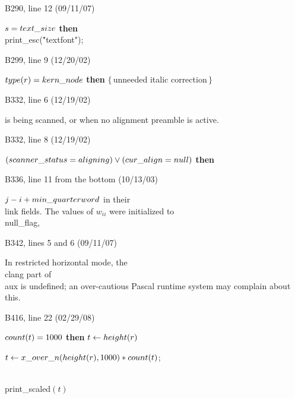 {{\bugonpage B290, line 12 (09/11/07)

\ninepoint\noindent
{} $s=\\{text\_size}$ {\bf then}
 \\{print\_esc}(\.{"textfont"});

\bugonpage B299, line 9 (12/20/02)

\ninepoint\noindent
\qquad\qquad{} $\\{type}(r)=\\{kern\_node}$ {\bf then}
 \quad$\{\,$unneeded italic correction$\,\}$

\bugonpage B332, line 6 (12/19/02)

\tenpoint\noindent
is being scanned, or when no alignment preamble is active.

\bugonpage B332, line 8 (12/19/02)

\ninepoint\noindent
{} $(\\{scanner\_status}=\\{aligning}) \lor
 (\\{cur\_align}=\\{null})$ {\bf then}

\bugonpage B336, line 11 from the bottom (10/13/03)

\tenpoint\noindent
$j-i+\\{min\_quarterword}$ in their
\\{link} fields. The values of $w_{ii}$ were initialized to
\\{null\_flag},\cutpar

\bugonpage B342, lines 5 and 6 (09/11/07)

\tenpoint
In restricted horizontal mode, the \\{clang} part of \\{aux} is undefined;
an over-cautious Pascal runtime system may complain about this.

\bugonpage B416, line 22 (02/29/08)

\ninepoint\noindent
\qquad{} $\\{count}(t)=1000$ {\bf then} $t\gets\\{height}(r)$
\par\noindent
\qquad{} $t\gets\\{x\_over\_n}(\\{height}(r),1000)*\\{count}(t)$;
\par\noindent
\qquad\qquad\\{print\_scaled}$(t)$

}}
